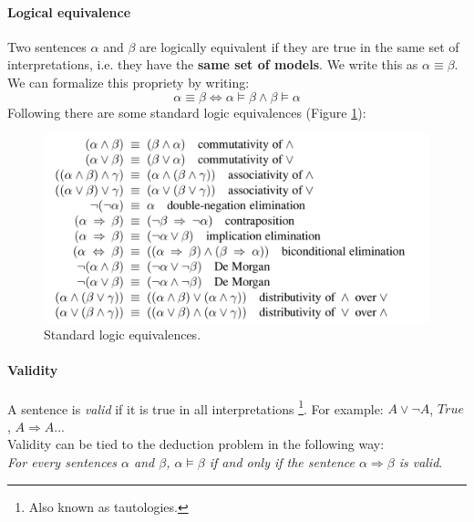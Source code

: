 \documentclass[10pt,a4paper]{article}
\begin{document}
\paragraph{Logical equivalence} Two sentences $\alpha$ and $\beta$ are logically equivalent if they are true in the same set of interpretations, i.e. they have the \textbf{same set of models}. We write this as $\alpha \equiv \beta$. We can formalize this propriety by writing:
\[\alpha \equiv \beta \Longleftrightarrow \alpha \models \beta \wedge \beta \models \alpha\]
Following there are some standard logic equivalences (Figure \ref{fig:logic_equivalences}):


\begin{figure}[H]
\includegraphics[scale=0.3]{images/equivalences.png}
\caption{Standard logic equivalences.}
\label{fig:logic_equivalences}
\end{figure}


\paragraph{Validity}
\label{sec:validity}
A sentence is \textit{valid} if it is true in all interpretations \footnote{Also known as tautologies.}. For example: $A \vee \neg A$, $True$, $A \Rightarrow A$...\\
Validity can be tied to the deduction problem in the following way:\\
\textit{For every sentences $\alpha$ and $\beta$, $\alpha \models \beta$ if and only if the sentence $\alpha \Rightarrow \beta$ is valid}.
\end{document}

